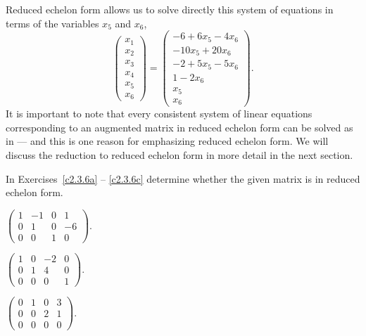 \documentclass{ximera}
\begin{document}
Reduced echelon form allows us to solve directly this system of
equations in terms of the variables $x_5$ and $x_6$,
\begin{equation}  \label{e:refexamp6}
\left(\begin{array}{c} x_1\\x_2\\x_3\\x_4\\x_5\\x_6\end{array}\right) =
\left(\begin{array}{c} -6+6x_5-4x_6\\-10x_5+20x_6\\
-2+5x_5-5x_6\\1-2x_6\\x_5\\x_6\end{array}\right).
\end{equation}
It is important to note that every consistent system of linear equations
corresponding to an augmented matrix in reduced echelon form can be
solved as in  --- and this is one reason for emphasizing
reduced echelon form.  We will discuss the reduction to reduced echelon
form in more detail in the next section.

\EXER


\TEXER

\noindent In Exercises~\ref{c2.3.6a} -- \ref{c2.3.6c} determine
whether the given matrix is in reduced echelon form.
\begin{exercise} \label{c2.3.6a}
$\left(\begin{array}{rrrr}
1 & -1 &  0 &   1   \\
0 &  1 &  0 &  -6    \\
0 &  0 &  1 &   0   \end{array}\right)$.
\end{exercise}
\begin{exercise} \label{c2.3.6b}
$\left(\begin{array}{rrrr}
1 &  0 & -2 &   0   \\
0 &  1 &  4 &   0    \\
0 &  0 &  0 &   1  \end{array}\right)$.
\end{exercise}
\begin{exercise} \label{c2.3.6c}
$\left(\begin{array}{rrrr}
0 &  1 &  0 &   3   \\
0 &  0 &  2 &   1    \\
0 &  0 &  0 &   0   \end{array}\right)$.
\end{exercise}
\end{document}
